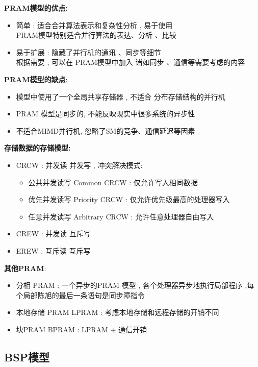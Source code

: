 \documentclass[UTF8,a4paper]{ctexart}
\begin{document}
  \textbf{PRAM模型的优点:}
  \begin{itemize}
    \item 简单 : 适合合并算法表示和复杂性分析 , 易于使用\\
    PRAM模型特别适合并行算法的表达、分析 、比较
    \item 易于扩展 : 隐藏了并行机的通讯 、同步等细节\\
    根据需要 , 可以在 PRAM模型中加入 诸如同步 、通信等需要考虑的内容
  \end{itemize}

  \textbf{PRAM模型的缺点}:
  \begin{itemize}
    \item 模型中使用了一个全局共享存储器 , 不适合 分布存储结构的并行机
    \item PRAM 模型是同步的, 不能反映现实中很多系统的异步性
    \item 不适合MIMD并行机, 忽略了SM的竞争、通信延迟等因素
  \end{itemize}

  \textbf{存储数据的存储模型:}
  \begin{itemize}
    \item CRCW : 并发读 并发写 , 冲突解决模式:
    \begin{itemize}
      \item 公共并发读写 Common CRCW : 仅允许写入相同数据
      \item 优先并发读写 Priority CRCW : 仅允许优先级最高的处理器写入
      \item 任意并发读写 Arbitrary CRCW : 允许任意处理器自由写入
    \end{itemize}
    \item CREW : 并发读 互斥写
    \item EREW : 互斥读 互斥写
  \end{itemize}

  \textbf{其他PRAM}:
  \begin{itemize}
    \item 分相 PRAM : 一个异步的PRAM 模型 , 各个处理器异步地执行局部程序 ,每个局部陈旭的最后一条语句是同步障指令
    \item 本地存储 PRAM LPRAM : 考虑本地存储和远程存储的开销不同
    \item 块PRAM BPRAM : LPRAM + 通信开销
  \end{itemize}

  \subsection{BSP模型}
\end{document}
